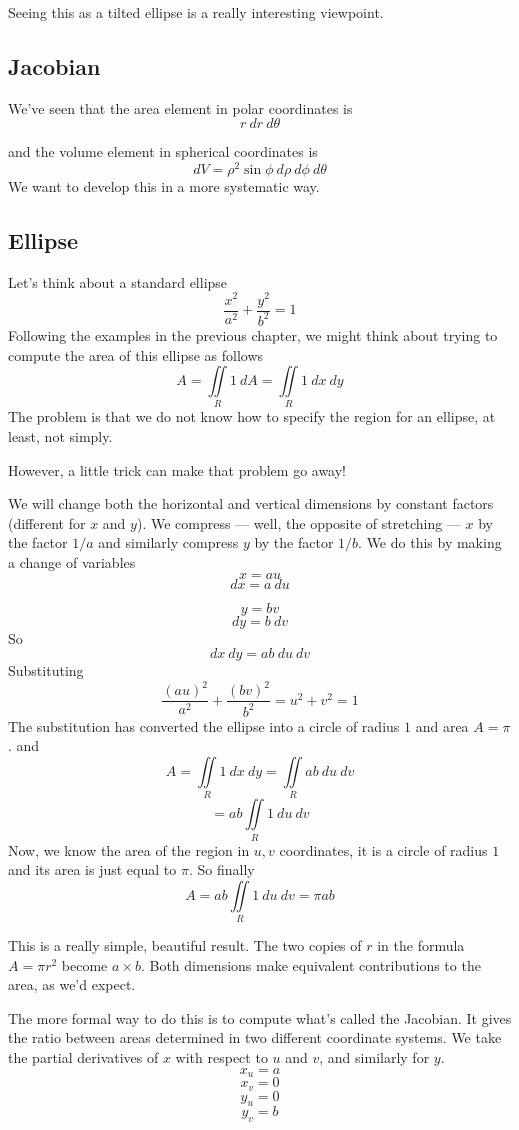 \documentclass[11pt, oneside]{article}
\begin{document}
Seeing this as a tilted ellipse is a really interesting viewpoint.

\subsection*{Jacobian}

We've seen that the area element in polar coordinates is
\[ r \ dr \ d \theta \]

and the volume element in spherical coordinates is
\[ dV = \rho^2 \sin \phi  \ d \rho \ d \phi \ d \theta \]
We want to develop this in a more systematic way.

\subsection*{Ellipse}
Let's think about a standard ellipse
\[ \frac{x^2}{a^2} + \frac{y^2}{b^2} = 1 \]
Following the examples in the previous chapter, we might think about trying to compute the area of this ellipse as follows
\[ A = \iint\limits_{R} 1 \ dA = \iint\limits_{R} 1 \ dx \ dy \]
The problem is that we do not know how to specify the region for an ellipse, at least, not simply.  

However, a little trick can make that problem go away!

We will change both the horizontal and vertical dimensions by constant factors (different for $x$ and $y$).  We compress --- well, the opposite of stretching --- $x$ by the factor $1/a$ and similarly compress $y$ by the factor $1/b$.  We do this by making a change of variables
\[ x = au\] 
\[ dx = a\ du \]

\[ y = bv \]
\[ dy = b\ dv \]
So 
\[ dx \ dy = ab \ du \ dv \]
Substituting
\[ \frac{(au)^2}{a^2} + \frac{(bv)^2}{b^2} = u^2 + v^2 = 1\]
The substitution has converted the ellipse into a circle of radius $1$ and area $A = \pi$.
and
\[ A = \iint\limits_{R} 1 \ dx \ dy =  \iint\limits_{R} ab \ du \ dv \]
\[ = ab \iint\limits_{R} 1 \ du \ dv \]
Now, we know the area of the region in $u,v$ coordinates, it is a circle of radius $1$ and its area is just equal to $\pi$.  So finally
\[ A = ab \iint\limits_{R} 1 \ du \ dv = \pi a b \]

This is a really simple, beautiful result.  The two copies of $r$ in the formula $A= \pi r^2$ become $a \times b$.  Both dimensions make equivalent contributions to the area, as we'd expect.

The more formal way to do this is to compute what's called the Jacobian.  It gives the ratio between areas determined in two different coordinate systems.  We take the partial derivatives of $x$ with respect to $u$ and $v$, and similarly for $y$.
\[ x_u = a \]
\[ x_v = 0 \]
\[ y_u = 0 \]
\[ y_v = b \]
\end{document}
